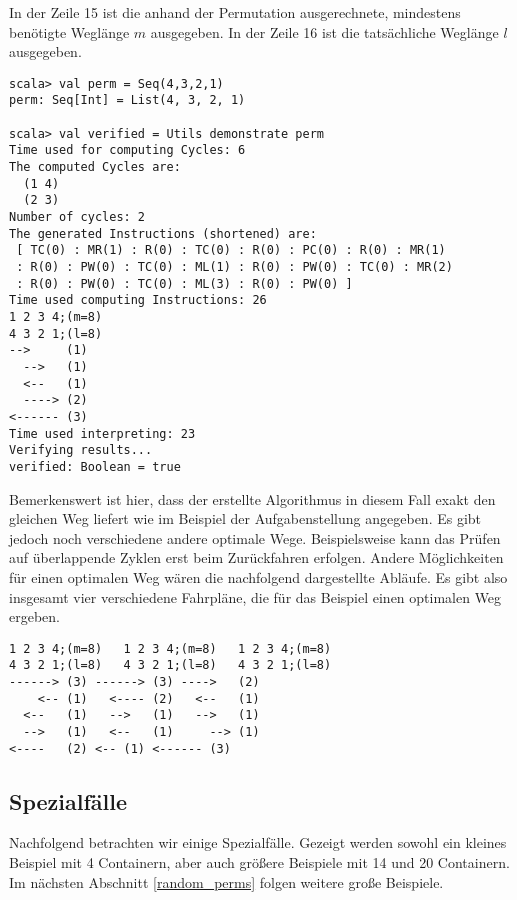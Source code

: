 In der Zeile 15 ist die anhand der Permutation ausgerechnete, mindestens benötigte Weglänge $m$ ausgegeben.
In der Zeile 16 ist die tatsächliche Weglänge $l$ ausgegeben.
\begin{lstlisting}
scala> val perm = Seq(4,3,2,1)
perm: Seq[Int] = List(4, 3, 2, 1)

scala> val verified = Utils demonstrate perm 
Time used for computing Cycles: 6
The computed Cycles are: 
  (1 4)
  (2 3)
Number of cycles: 2
The generated Instructions (shortened) are: 
 [ TC(0) : MR(1) : R(0) : TC(0) : R(0) : PC(0) : R(0) : MR(1)
 : R(0) : PW(0) : TC(0) : ML(1) : R(0) : PW(0) : TC(0) : MR(2)
 : R(0) : PW(0) : TC(0) : ML(3) : R(0) : PW(0) ] 
Time used computing Instructions: 26
1 2 3 4;(m=8)
4 3 2 1;(l=8)
-->     (1)
  -->   (1)
  <--   (1)
  ----> (2)
<------ (3)
Time used interpreting: 23
Verifying results...
verified: Boolean = true
\end{lstlisting}
 Bemerkenswert ist hier, dass der erstellte Algorithmus in diesem Fall exakt den gleichen Weg liefert wie im Beispiel der Aufgabenstellung angegeben.
 Es gibt jedoch noch verschiedene andere optimale Wege.
 Beispielsweise kann das Prüfen auf überlappende Zyklen erst beim Zurückfahren erfolgen.
 Andere Möglichkeiten für einen optimalen Weg wären die nachfolgend dargestellte Abläufe.
 Es gibt also insgesamt vier verschiedene Fahrpläne, die für das Beispiel einen optimalen Weg ergeben.
\begin{lstlisting}                   
1 2 3 4;(m=8)	1 2 3 4;(m=8)	1 2 3 4;(m=8)
4 3 2 1;(l=8)	4 3 2 1;(l=8)	4 3 2 1;(l=8)
------>	(3)	------>	(3)	---->	(2)
    <--	(1)	  <----	(2)	  <--	(1)
  <--	(1)	  -->	(1)	  -->	(1)
  -->	(1)	  <--	(1)	    -->	(1)
<----	(2)	<--	(1)	<------	(3)
\end{lstlisting}
\clearpage
\subsection{Spezialfälle}
\label{special_cases}
Nachfolgend betrachten wir einige Spezialfälle. Gezeigt werden sowohl ein kleines Beispiel mit 4 Containern, aber auch größere Beispiele mit 14 und 20 Containern.
Im nächsten Abschnitt \ref{random_perms} folgen weitere große Beispiele.
